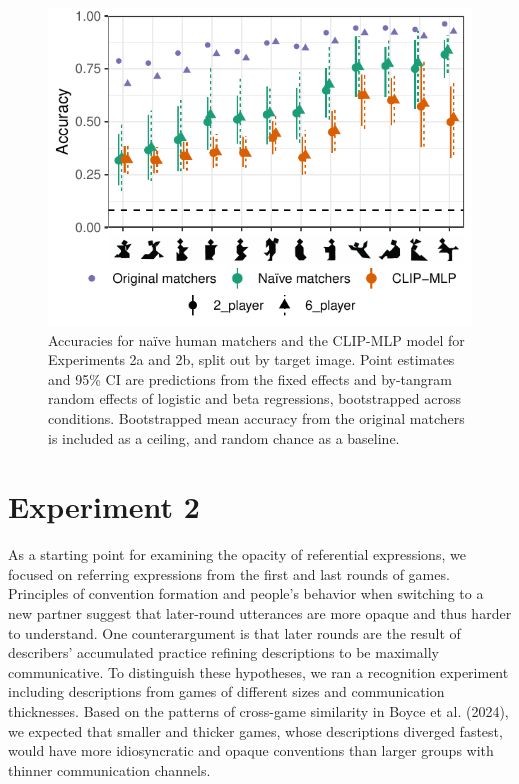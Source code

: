 \documentclass[10pt, letterpaper]{article}
\begin{document}
\begin{CodeChunk}
\begin{figure}[t]

{\centering \includegraphics[width=0.9\linewidth]{figs/fig-2-1} 

}

\caption[Accuracies for naïve human matchers and the CLIP-MLP model for Experiments 2a and 2b, split out by target image]{Accuracies for naïve human matchers and the CLIP-MLP model for Experiments 2a and 2b, split out by target image. Point estimates and 95\% CI are predictions from the fixed effects and by-tangram random effects of logistic and beta regressions, bootstrapped across conditions. Bootstrapped mean accuracy from the original matchers is included as a ceiling, and random chance as a baseline. \label{expt2-tangram}}\label{fig:fig-2}
\end{figure}
\end{CodeChunk}

\section{Experiment 2}\label{experiment-2}

As a starting point for examining the opacity of referential
expressions, we focused on referring expressions from the first and last
rounds of games. Principles of convention formation and people's
behavior when switching to a new partner suggest that later-round
utterances are more opaque and thus harder to understand. One
counterargument is that later rounds are the result of describers'
accumulated practice refining descriptions to be maximally
communicative. To distinguish these hypotheses, we ran a recognition
experiment including descriptions from games of different sizes and
communication thicknesses. Based on the patterns of cross-game
similarity in Boyce et al. (2024), we expected that smaller and thicker
games, whose descriptions diverged fastest, would have more
idiosyncratic and opaque conventions than larger groups with thinner
communication channels.
\end{document}
